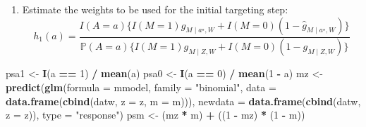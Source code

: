\documentclass[
  12pt, krantz2,
]{book}
\makeatletter
\newenvironment{Shaded}{\begin{snugshade}}{\end{snugshade}}
\newcommand{\DataTypeTok}[1]{\textcolor[rgb]{0.13,0.29,0.53}{#1}}
\newcommand{\DecValTok}[1]{\textcolor[rgb]{0.00,0.00,0.81}{#1}}
\newcommand{\KeywordTok}[1]{\textcolor[rgb]{0.13,0.29,0.53}{\textbf{#1}}}
\newcommand{\NormalTok}[1]{#1}
\newcommand{\OperatorTok}[1]{\textcolor[rgb]{0.81,0.36,0.00}{\textbf{#1}}}
\newcommand{\StringTok}[1]{\textcolor[rgb]{0.31,0.60,0.02}{#1}}
\providecommand{\tightlist}{%
  \setlength{\itemsep}{0pt}\setlength{\parskip}{0pt}}
\newenvironment{kframe}{%
\medskip{}
\setlength{\fboxsep}{.8em}
 \def\at@end@of@kframe{}%
 \ifinner\ifhmode%
  \def\at@end@of@kframe{\end{minipage}}%
  \begin{minipage}{\columnwidth}%
 \fi\fi%
 \def\FrameCommand##1{\hskip\@totalleftmargin \hskip-\fboxsep
 \colorbox{shadecolor}{##1}\hskip-\fboxsep
     \hskip-\linewidth \hskip-\@totalleftmargin \hskip\columnwidth}%
 \MakeFramed {\advance\hsize-\width
   \@totalleftmargin\z@ \linewidth\hsize
   \@setminipage}}%
 {\par\unskip\endMakeFramed%
 \at@end@of@kframe}
\renewenvironment{Shaded}{\begin{kframe}}{\end{kframe}}
\theoremstyle{definition}
\theoremstyle{definition}
\theoremstyle{definition}
\renewcommand{\P}{\mathbb{P}}
\newcommand{\1}{\mathbbm{1}}
\makeatother
\begin{document}
\begin{enumerate}
\def\labelenumi{\arabic{enumi}.}
\setcounter{enumi}{4}
\tightlist
\item
  Estimate the weights to be used for the initial targeting step:
  \begin{equation*}
     h_1(a) = \frac{I(A=a)\{I(M=1)\hat{g}_{M \mid a^{\star}, W} +
       I(M=0)(1-\hat{g}_{M \mid a^{\star}, W}) \}}{\P(A=a)\{I(M=1)
       g_{M \mid Z,W} + I(M=0)(1-g_{M \mid Z,W}) \}}
  \end{equation*}
\end{enumerate}

\begin{Shaded}
\begin{Highlighting}[]
\NormalTok{psa1 <-}\StringTok{ }\KeywordTok{I}\NormalTok{(a }\OperatorTok{==}\StringTok{ }\DecValTok{1}\NormalTok{) }\OperatorTok{/}\StringTok{ }\KeywordTok{mean}\NormalTok{(a)}
\NormalTok{psa0 <-}\StringTok{ }\KeywordTok{I}\NormalTok{(a }\OperatorTok{==}\StringTok{ }\DecValTok{0}\NormalTok{) }\OperatorTok{/}\StringTok{ }\KeywordTok{mean}\NormalTok{(}\DecValTok{1} \OperatorTok{-}\StringTok{ }\NormalTok{a)}
\NormalTok{mz <-}\StringTok{ }\KeywordTok{predict}\NormalTok{(}\KeywordTok{glm}\NormalTok{(}\DataTypeTok{formula =}\NormalTok{ mmodel, }\DataTypeTok{family =} \StringTok{"binomial"}\NormalTok{,}
                  \DataTypeTok{data =} \KeywordTok{data.frame}\NormalTok{(}\KeywordTok{cbind}\NormalTok{(datw, }\DataTypeTok{z =}\NormalTok{ z, }\DataTypeTok{m =}\NormalTok{ m))),}
              \DataTypeTok{newdata =} \KeywordTok{data.frame}\NormalTok{(}\KeywordTok{cbind}\NormalTok{(datw, }\DataTypeTok{z =}\NormalTok{ z)), }\DataTypeTok{type =} \StringTok{"response"}\NormalTok{)}
\NormalTok{psm <-}\StringTok{ }\NormalTok{(mz }\OperatorTok{*}\StringTok{ }\NormalTok{m) }\OperatorTok{+}\StringTok{ }\NormalTok{((}\DecValTok{1} \OperatorTok{-}\StringTok{ }\NormalTok{mz) }\OperatorTok{*}\StringTok{ }\NormalTok{(}\DecValTok{1} \OperatorTok{-}\StringTok{ }\NormalTok{m))}


\end{Highlighting}
\end{Shaded}
\end{document}
